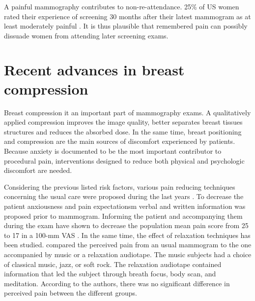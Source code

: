 A painful mammography contributes to non-re-attendance. 25\% of US women rated their experience of screening 30
months after their latest mammogram as at least moderately painful \cite{peipins_impact_2006}. It is thus plausible that remembered pain can possibly dissuade women from
attending later screening exams.

\section{Recent advances in breast compression}\label{section:compressionrecentadvances}

Breast compression it an important part of mammography exams. A qualitatively applied compression improves the image quality, better separates breast tissues structures and reduces the absorbed dose. In the same time, breast positioning and compression are the main sources of discomfort experienced by patients. Because anxiety is documented to be the most important contributor to procedural pain, interventions designed to reduce both physical and psychologic discomfort are needed.


Considering the previous listed risk factors, various pain reducing techniques concerning the usual care were proposed during the last years \citep{miller_interventions_2008}. To decrease the patient anxiousness and pain expectationsm verbal and written information was proposed prior to mammogram. Informing the patient and accompanying them during the exam have shown to decrease the population mean pain score from 25 to 17 in a 100-mm VAS \citep{shrestha_effect_2001}. In the same time, the effect of relaxation techniques has been studied. \cite{ domar_relaxation_2005} compared the perceived pain from an usual mammogram to the one  accompanied by music or a relaxation audiotape. The music subjects had a choice of classical music, jazz, or soft rock.  The relaxation audiotape contained information that led the subject through breath focus, body scan, and meditation. According to the authors, there was no significant difference in perceived pain between the different groups. 

